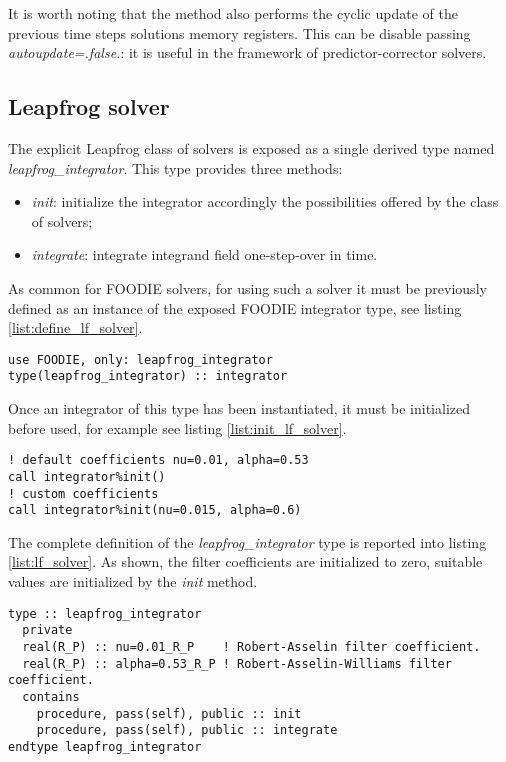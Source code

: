 It is worth noting that the method also performs the cyclic update of the previous time steps solutions memory registers. This can be disable passing \emph{autoupdate=.false.}: it is useful in the framework of predictor-corrector solvers.

\subsection{Leapfrog solver}\label{subsec:solver_leapfrog}

The explicit Leapfrog class of solvers is exposed as a single derived type named \emph{leapfrog\_integrator}. This type provides three methods:

\begin{itemize}
  \item \emph{init}: initialize the integrator accordingly the possibilities offered by the class of solvers;
  \item \emph{integrate}: integrate integrand field one-step-over in time.
  \end{itemize}

As common for FOODIE solvers, for using such a solver it must be previously defined as an instance of the exposed FOODIE integrator type, see listing \ref{list:define_lf_solver}.

\begin{lstlisting}[firstnumber=1,style=code,caption={definition of an explicit Leapfrog integrator},label={list:define_lf_solver}]
use FOODIE, only: leapfrog_integrator
type(leapfrog_integrator) :: integrator
\end{lstlisting}

Once an integrator of this type has been instantiated, it must be initialized before used, for example see listing \ref{list:init_lf_solver}.

\begin{lstlisting}[firstnumber=1,style=code,caption={example of initialization of an explicit Leapfrog integrator},label={list:init_lf_solver}]
! default coefficients nu=0.01, alpha=0.53
call integrator%init()
! custom coefficients
call integrator%init(nu=0.015, alpha=0.6)
\end{lstlisting}

The complete definition of the \emph{leapfrog\_integrator} type is reported into listing \ref{list:lf_solver}. As shown, the filter coefficients are initialized to zero, suitable values are initialized by the \emph{init} method.

\begin{lstlisting}[firstnumber=1,style=code,caption={definition of \emph{leapfrog\_integrator} type},label={list:lf_solver}]
type :: leapfrog_integrator
  private
  real(R_P) :: nu=0.01_R_P    ! Robert-Asselin filter coefficient.
  real(R_P) :: alpha=0.53_R_P ! Robert-Asselin-Williams filter coefficient.
  contains
    procedure, pass(self), public :: init
    procedure, pass(self), public :: integrate
endtype leapfrog_integrator
\end{lstlisting}

